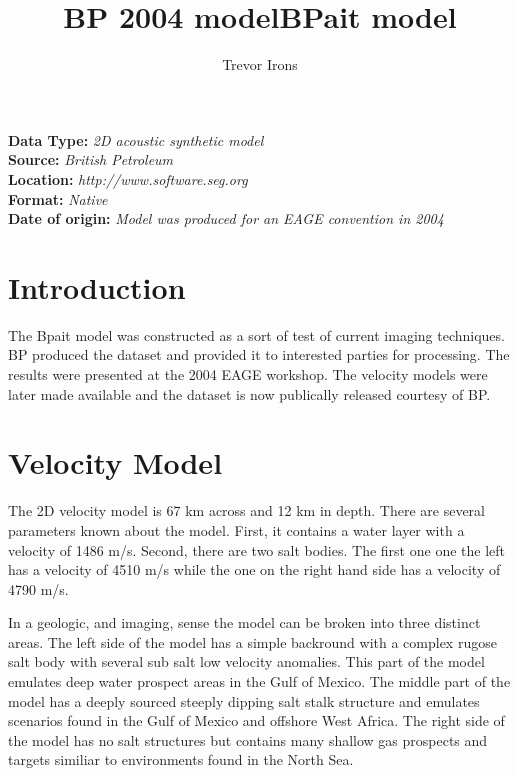 \title{BP 2004 model}
\author{}
\maketitle

\title{BPait model}
\author{Trevor Irons}
\maketitle
\lstset{language=python,numbers=left,numberstyle=\tiny,showstringspaces=false}

\noindent
\textbf {Data Type:} \emph{2D acoustic synthetic model}\\
\textbf {Source:} \emph{British Petroleum}\\
\textbf {Location:} \emph{http://www.software.seg.org}\\
\textbf {Format:} \emph{Native} \\
\textbf{Date of origin:} \emph{Model was produced for an EAGE convention in 2004}\\

\section{Introduction}
The Bpait model was constructed as a sort of test of current imaging techniques.  BP produced the dataset and provided it to interested parties for processing.  The results were presented at the 2004 EAGE workshop.  The velocity models were later made available and the dataset is now publically released courtesy of BP.  

{
\tiny

\normalsize
}

\section{Velocity Model}
The 2D velocity model is 67 km across and 12 km in depth. There are several parameters known about the model.  First, it contains a water layer with a velocity of 1486 m/s.  Second, there are two salt bodies.  The first one one the left has a velocity of 4510 m/s while the one on the right hand side has a velocity of 4790 m/s.  

In a geologic, and imaging, sense the model can be broken into three distinct areas.  The left side of the model has a simple backround with a complex rugose salt body with several sub salt low velocity anomalies.  This part of the model emulates deep water prospect areas in the Gulf of Mexico.  The middle part of the model has a deeply sourced steeply dipping salt stalk structure and emulates scenarios found in the Gulf of Mexico and offshore West Africa.  The right side of the model has no salt structures but contains many shallow gas prospects and targets similiar to environments found in the North Sea.        

